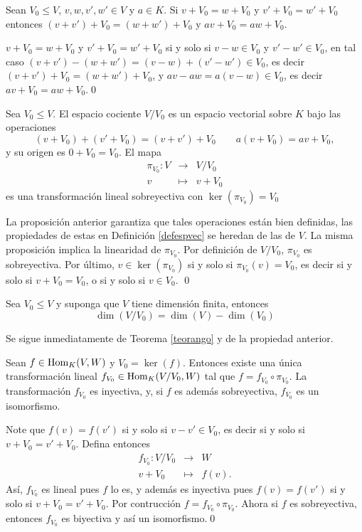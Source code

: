 \begin{prop}
Sean $V_0\le V$, $v,w,v',w'\in V$ y $a\in K$. Si $v+V_0=w+V_0$ y $v'+V_0=w'+V_0$ entonces $(v+v')+V_0=(w+w')+V_0$ y $av+V_0=aw+V_0$.
\end{prop}

\dem $v+V_0=w+V_0$ y $v'+V_0=w'+V_0$ si y solo si $v-w\in V_0$ y $v'-w'\in V_0$, en tal caso $(v+v')-(w+w')=(v-w)+(v'-w')\in V_0$, es decir $(v+v')+V_0=(w+w')+V_0$, y $av-aw=a(v-w)\in V_0$, es decir $av+V_0=aw+V_0$.\qed

\begin{pro}
Sea $V_0\le V$. El espacio cociente $V/V_0$ es un espacio vectorial sobre $K$ bajo las operaciones
\[
\left(v+V_0\right)+\left(v'+V_0\right)=(v+v')+V_0\qquad a\left(v+V_0\right)=av+V_0,
\]
y su origen es $0+V_0=V_0$. El mapa
\begin{eqnarray*}
\pi_{V_0}: V & \longrightarrow & V/V_0 \\
                v & \longmapsto & v+V_0
\end{eqnarray*}
es una transformaci\'on lineal sobreyectiva con $\ker(\pi_{V_0})=V_0$
\end{pro}

\dem La proposici\'on anterior garantiza que tales operaciones est\'an bien definidas, las propiedades de estas en Definici\'on \ref{defespvec} se heredan de las de $V$. La misma proposici\'on implica la linearidad de $\pi_{V_0}$. Por definici\'on de $V/V_0$, $\pi_{V_0}$ es sobreyectiva. Por \'ultimo, $v\in\ker(\pi_{V_0})$ si y solo si $\pi_{V_0}(v)=V_0$, es decir si y solo si $v+V_0=V_0$, o si y solo si $v\in V_0$. \qed

\begin{pro}
Sea $V_0\le V$ y suponga que $V$ tiene dimensi\'on finita, entonces
\[
\dim(V/V_0)=\dim(V)-\dim(V_0)
\]
\end{pro}

\dem Se sigue inmediatamente de Teorema \ref{teorango} y de la propiedad anterior.

\begin{teo}
Sean $f\in\operatorname{Hom}_K(V,W)$ y $V_0=\ker(f)$. Entonces existe una \'unica transformaci\'on lineal $f_{V_0}\in\operatorname{Hom}_K(V/V_0,W)$ tal que $f=f_{V_0}\circ\pi_{V_0}$. La transformaci\'on $f_{V_0}$ es inyectiva, y, si $f$ es adem\'as sobreyectiva, $f_{V_0}$ es un isomorfismo.
\end{teo}

\dem Note que $f(v)=f(v')$ si y solo si $v-v'\in V_0$, es decir si y solo si $v+V_0=v'+V_0$. Defina entonces
\begin{eqnarray*}
f_{V_0}: V/V_0 & \longrightarrow & W\\
            v+V_0 & \longmapsto      & f(v).
\end{eqnarray*}
As\'i, $f_{V_0}$ es lineal pues $f$ lo es, y adem\'as es inyectiva pues $f(v)=f(v')$ si y solo si $v+V_0=v'+V_0$. Por contrucci\'on $f=f_{V_0}\circ\pi_{V_0}$. Ahora si $f$ es sobreyectiva, entonces $f_{V_0}$ es biyectiva y as\'i un isomorfismo.\qed
 